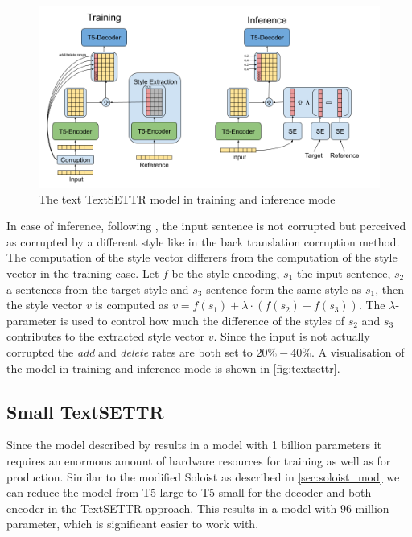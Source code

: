\documentclass[twocolumn]{tum-article}
\begin{document}
\begin{figure}[!h]
\centering
\includegraphics[width=\textwidth]{figures/TextSETTR.png}
\caption{The text TextSETTR model \cite{riley2020textsettr} in training and inference mode}
\label{fig:textsettr}
\end{figure}
In case of inference, following \cite{riley2020textsettr}, the input sentence is not corrupted but perceived as corrupted by a different style like in the back translation corruption method. The computation of the style vector differers from the computation of the style vector in the training case. Let $f$ be the style encoding, $s_1$ the input sentence, $s_2$ a sentences from the target style and $s_3$ sentence form the same style as $s_1$, then the style vector $v$ is computed as $v = f(s_1) + \lambda \cdot (f(s_2) - f(s_3))$. The $\lambda$-parameter is used to control how much the difference of the styles of $s_2$ and $s_3$ contributes to the extracted style vector $v$. Since the input is not actually corrupted the \textit{add} and \textit{delete} rates are both set to $20\%-40\%$. A visualisation of the model in training and inference mode is shown in \autoref{fig:textsettr}.
\subsection{Small TextSETTR}\label{sec:textsettr_small}
Since the model described by \cite{riley2020textsettr} results in a model with 1 billion parameters it requires an enormous amount of hardware resources for training as well as for production. Similar to the modified Soloist as described in \autoref{sec:soloist_mod} we can reduce the model from T5-large to T5-small for the decoder and both encoder in the TextSETTR approach. This results in a model with $96$ million parameter, which is significant easier to work with. 
\end{document}

